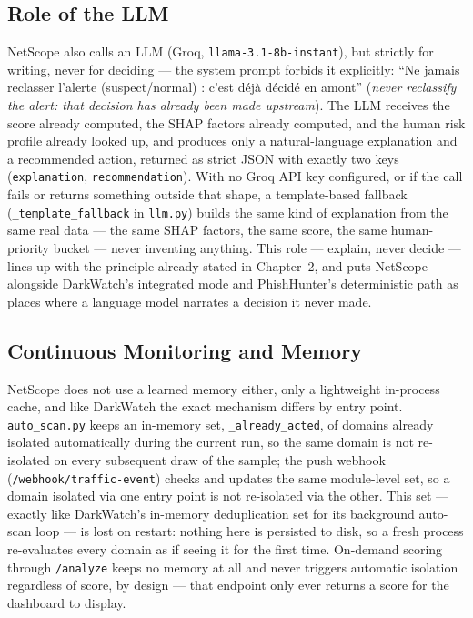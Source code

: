 \subsection*{Role of the LLM}
NetScope also calls an LLM (Groq, \texttt{llama-3.1-8b-instant}), but
strictly for writing, never for deciding --- the system prompt forbids it
explicitly: ``Ne jamais reclasser l'alerte (suspect/normal) : c'est déjà
décidé en amont'' (\emph{never reclassify the alert: that decision has
already been made upstream}). The LLM receives the score already computed,
the SHAP factors already computed, and the human risk profile already
looked up, and produces only a natural-language explanation and a
recommended action, returned as strict JSON with exactly two keys
(\texttt{explanation}, \texttt{recommendation}). With no Groq API key
configured, or if the call fails or returns something outside that shape, a
template-based fallback (\texttt{\_template\_fallback} in \texttt{llm.py})
builds the same kind of explanation from the same real data --- the same
SHAP factors, the same score, the same human-priority bucket --- never
inventing anything. This role --- explain, never decide --- lines up with
the principle already stated in Chapter~2, and puts NetScope alongside
DarkWatch's integrated mode and PhishHunter's deterministic path as places
where a language model narrates a decision it never made.

\subsection*{Continuous Monitoring and Memory}
NetScope does not use a learned memory either, only a lightweight
in-process cache, and like DarkWatch the exact mechanism differs by entry
point. \texttt{auto\_scan.py} keeps an in-memory set, \texttt{\_already\_acted},
of domains already isolated automatically during the current run, so the
same domain is not re-isolated on every subsequent draw of the sample; the
push webhook (\texttt{/webhook/traffic-event}) checks and updates the same
module-level set, so a domain isolated via one entry point is not
re-isolated via the other. This set --- exactly like DarkWatch's in-memory
deduplication set for its background auto-scan loop --- is lost on
restart: nothing here is persisted to disk, so a fresh process re-evaluates
every domain as if seeing it for the first time. On-demand scoring through
\texttt{/analyze} keeps no memory at all and never triggers automatic
isolation regardless of score, by design --- that endpoint only ever
returns a score for the dashboard to display.

